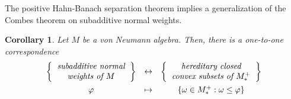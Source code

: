\documentclass[a4paper]{amsart}
\theoremstyle{plain}
\newtheorem{cor}[thm]{Corollary}
\theoremstyle{definition}
\begin{document}
The positive Hahn-Banach separation theorem implies a generalization of the Combes theorem on subadditive normal weights.
\begin{cor}
Let $M$ be a von Neumann algebra.
Then, there is a one-to-one correspondence
\[\begin{array}{ccc}
\left\{\emph{\begin{tabular}{c}subadditive normal\\weights of $M$\end{tabular}}\right\}&\leftrightarrow&\left\{\emph{\begin{tabular}{c}hereditary closed\\convex subsets of $M_*^+$\end{tabular}}\right\}\\[10pt]
\varphi&\mapsto&\{\omega\in M_*^+:\omega\le\varphi\}
\end{array}\]
\end{cor}
\end{document}
